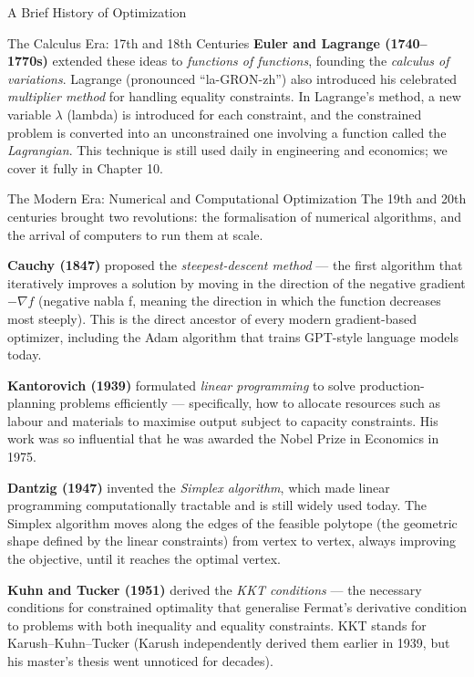 \documentclass[aspectratio=169,10pt]{beamer}
\begin{document}
\begin{frame}[allowframebreaks]{A Brief History of Optimization}
\begin{block}{The Calculus Era: 17th and 18th Centuries}
    \medskip
    \textbf{Euler and Lagrange (1740--1770s)} extended these ideas to
    \emph{functions of functions}, founding the \emph{calculus of variations}.
    Lagrange (pronounced ``la-GRON-zh'') also introduced his celebrated
    \emph{multiplier method} for handling equality constraints.
    In Lagrange's method, a new variable $\lambda$ (lambda) is introduced for
    each constraint, and the constrained problem is converted into an
    unconstrained one involving a function called the \emph{Lagrangian}.
    This technique is still used daily in engineering and economics; we cover
    it fully in Chapter 10.
  \end{block}

  \framebreak

  \begin{block}{The Modern Era: Numerical and Computational Optimization}
    The 19th and 20th centuries brought two revolutions: the formalisation of
    numerical algorithms, and the arrival of computers to run them at scale.

    \medskip
    \textbf{Cauchy (1847)} proposed the \emph{steepest-descent method} ---
    the first algorithm that iteratively improves a solution by moving in the
    direction of the negative gradient $-\nabla f$ (negative nabla f, meaning
    the direction in which the function decreases most steeply).  This is the
    direct ancestor of every modern gradient-based optimizer, including the Adam
    algorithm that trains GPT-style language models today.

    \medskip
    \textbf{Kantorovich (1939)} formulated \emph{linear programming} to solve
    production-planning problems efficiently --- specifically, how to allocate
    resources such as labour and materials to maximise output subject to capacity
    constraints.  His work was so influential that he was awarded the Nobel Prize
    in Economics in 1975.

    \medskip
    \textbf{Dantzig (1947)} invented the \emph{Simplex algorithm}, which made
    linear programming computationally tractable and is still widely used today.
    The Simplex algorithm moves along the edges of the feasible polytope (the
    geometric shape defined by the linear constraints) from vertex to vertex,
    always improving the objective, until it reaches the optimal vertex.

    \medskip
    \textbf{Kuhn and Tucker (1951)} derived the \emph{KKT conditions} ---
    the necessary conditions for constrained optimality that generalise Fermat's
    derivative condition to problems with both inequality and equality constraints.
    KKT stands for Karush--Kuhn--Tucker (Karush independently derived them
    earlier in 1939, but his master's thesis went unnoticed for decades).


\end{block}
\end{frame}
\end{document}
